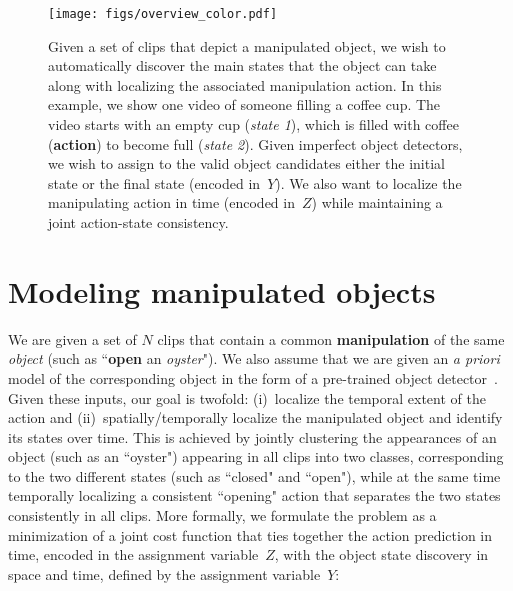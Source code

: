 \begin{figure*}[t!]
   \centering
     \texttt{[image: figs/overview\_color.pdf]}
     \caption{
     Given a set of clips that depict a manipulated object, we wish to automatically discover the main states that the object can take along with localizing the associated manipulation action.
     In this example, we show one video of someone filling a coffee cup.
     The video starts with an empty cup (\textit{state 1}), which is filled with coffee (\textbf{action}) to become full (\textit{state 2}).
     Given imperfect object detectors, we wish to assign to the valid object candidates either the initial state or the final state (encoded in~$Y$).
	 We also want to localize the manipulating action in time (encoded in~$Z$) while maintaining a joint action-state consistency.
     }
     \vspace{-2mm} %
     \label{fig:mainpaper}
 \end{figure*}	

\section{Modeling manipulated objects}
\label{sec:approach}

We are given a set of $N$ clips that contain a common \textbf{manipulation} of the same \textit{object} (such as ``\textbf{open} an \textit{oyster}").
%
We also assume that we are given an \emph{a priori} model of the corresponding object in the form of a pre-trained object detector~\cite{girsh15fastrcnn}.
Given these inputs, our goal is twofold: (i)~localize the temporal extent of the action and (ii)~spatially/temporally localize the manipulated object and identify its states over time.
%
This is achieved by jointly clustering the appearances of an object (such as an ``oyster") appearing in all clips into two classes, corresponding to the two different states (such as ``closed" and ``open"), while at the same time temporally localizing a consistent ``opening" action that separates the two states consistently in all clips.   
More formally, we formulate the problem as a minimization of a joint cost function that ties together the action prediction in time, encoded in the assignment variable~$Z$, with the object state discovery in space and time, defined by the assignment variable~$Y$:


